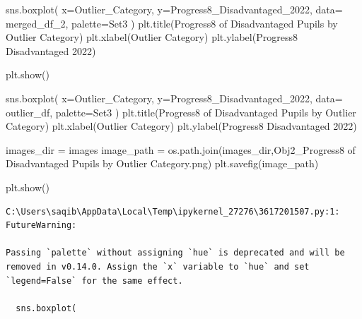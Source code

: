 \documentclass[
  letterpaper,
  DIV=11,
  numbers=noendperiod]{scrartcl}
\newenvironment{Shaded}{\begin{snugshade}}{\end{snugshade}}
\newcommand{\NormalTok}[1]{\textcolor[rgb]{0.00,0.23,0.31}{#1}}
\newcommand{\OperatorTok}[1]{\textcolor[rgb]{0.37,0.37,0.37}{#1}}
\newcommand{\StringTok}[1]{\textcolor[rgb]{0.13,0.47,0.30}{#1}}
\begin{document}
\begin{Shaded}
\begin{Highlighting}[]
\NormalTok{sns.boxplot(}
\NormalTok{    x}\OperatorTok{=}\StringTok{\textquotesingle{}Outlier\_Category\textquotesingle{}}\NormalTok{, }
\NormalTok{    y}\OperatorTok{=}\StringTok{\textquotesingle{}Progress8\_Disadvantaged\_2022\textquotesingle{}}\NormalTok{, }
\NormalTok{    data}\OperatorTok{=}\NormalTok{ merged\_df\_2,  }
\NormalTok{    palette}\OperatorTok{=}\StringTok{\textquotesingle{}Set3\textquotesingle{}}
\NormalTok{)}
\NormalTok{plt.title(}\StringTok{\textquotesingle{}Progress8 of Disadvantaged Pupils by Outlier Category\textquotesingle{}}\NormalTok{)}
\NormalTok{plt.xlabel(}\StringTok{\textquotesingle{}Outlier Category\textquotesingle{}}\NormalTok{)}
\NormalTok{plt.ylabel(}\StringTok{\textquotesingle{}Progress8 Disadvantaged 2022\textquotesingle{}}\NormalTok{)}

\NormalTok{plt.show()}


\NormalTok{sns.boxplot(}
\NormalTok{    x}\OperatorTok{=}\StringTok{\textquotesingle{}Outlier\_Category\textquotesingle{}}\NormalTok{, }
\NormalTok{    y}\OperatorTok{=}\StringTok{\textquotesingle{}Progress8\_Disadvantaged\_2022\textquotesingle{}}\NormalTok{, }
\NormalTok{    data}\OperatorTok{=}\NormalTok{ outlier\_df,  }
\NormalTok{    palette}\OperatorTok{=}\StringTok{\textquotesingle{}Set3\textquotesingle{}}
\NormalTok{)}
\NormalTok{plt.title(}\StringTok{\textquotesingle{}Progress8 of Disadvantaged Pupils by Outlier Category\textquotesingle{}}\NormalTok{)}
\NormalTok{plt.xlabel(}\StringTok{\textquotesingle{}Outlier Category\textquotesingle{}}\NormalTok{)}
\NormalTok{plt.ylabel(}\StringTok{\textquotesingle{}Progress8 Disadvantaged 2022\textquotesingle{}}\NormalTok{)}

\NormalTok{images\_dir }\OperatorTok{=} \StringTok{\textquotesingle{}images\textquotesingle{}}
\NormalTok{image\_path }\OperatorTok{=}\NormalTok{ os.path.join(images\_dir,}\StringTok{\textquotesingle{}Obj2\_Progress8 of Disadvantaged Pupils by Outlier Category.png\textquotesingle{}}\NormalTok{)}
\NormalTok{plt.savefig(image\_path)}

\NormalTok{plt.show()}
\end{Highlighting}
\end{Shaded}

\begin{verbatim}
C:\Users\saqib\AppData\Local\Temp\ipykernel_27276\3617201507.py:1: FutureWarning: 

Passing `palette` without assigning `hue` is deprecated and will be removed in v0.14.0. Assign the `x` variable to `hue` and set `legend=False` for the same effect.

  sns.boxplot(
\end{verbatim}
\end{document}
